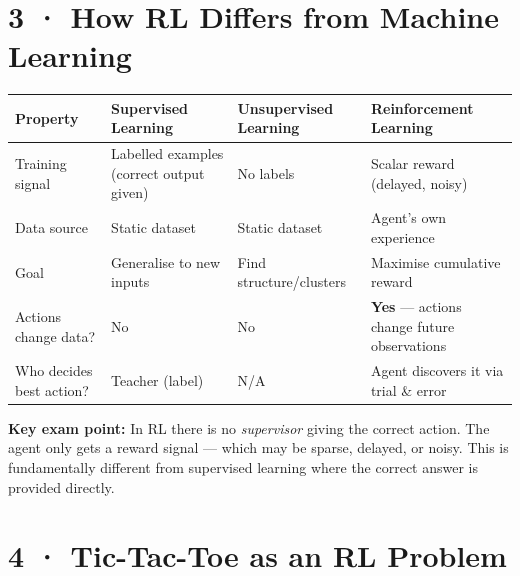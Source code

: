\documentclass[11pt,a4paper]{article}
\begin{document}
\section*{3 · How RL Differs from Machine Learning}

\begin{tcolorbox}[defn={Three-Way Comparison}]
\centering\small
\begin{tabular}{p{3.2cm}p{3.8cm}p{3.8cm}p{3.5cm}}
\toprule
\textbf{Property} & \textbf{Supervised Learning} & \textbf{Unsupervised Learning} & \textbf{Reinforcement Learning} \\
\midrule
Training signal & Labelled examples (correct output given) & No labels & Scalar reward (delayed, noisy) \\
Data source & Static dataset & Static dataset & Agent's own experience \\
Goal & Generalise to new inputs & Find structure/clusters & Maximise cumulative reward \\
Actions change data? & No & No & \textbf{Yes} — actions change future observations \\
Who decides best action? & Teacher (label) & N/A & Agent discovers it via trial \& error \\
\bottomrule
\end{tabular}
\end{tcolorbox}

\textbf{Key exam point:} In RL there is no \emph{supervisor} giving the correct action.
The agent only gets a reward signal — which may be sparse, delayed, or noisy.
This is fundamentally different from supervised learning where the correct answer is provided directly.

\section*{4 · Tic-Tac-Toe as an RL Problem}
\end{document}
